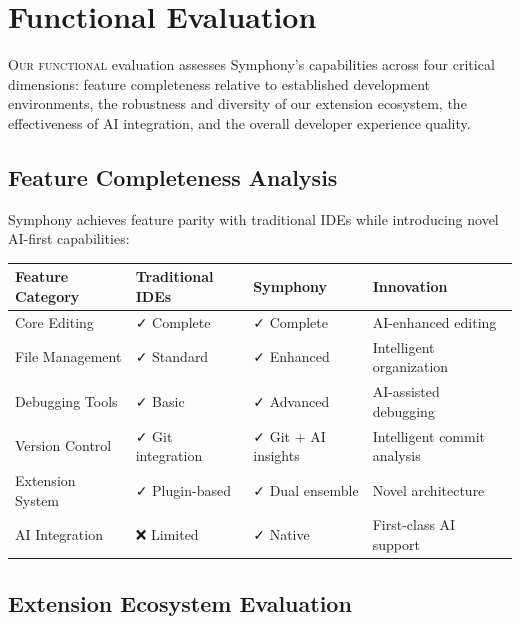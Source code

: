 
\section*{Functional Evaluation}

\lettrine{O}{ur functional} evaluation assesses Symphony's capabilities across four critical dimensions: feature completeness relative to established development environments, the robustness and diversity of our extension ecosystem, the effectiveness of AI integration, and the overall developer experience quality.

\subsection*{Feature Completeness Analysis}

Symphony achieves feature parity with traditional IDEs while introducing novel AI-first capabilities:

\begin{center}
\begin{tabular}{@{}llll@{}}
\toprule
\textbf{Feature Category} & \textbf{Traditional IDEs} & \textbf{Symphony} & \textbf{Innovation} \\
\midrule
Core Editing & ✓ Complete & ✓ Complete & AI-enhanced editing \\
File Management & ✓ Standard & ✓ Enhanced & Intelligent organization \\
Debugging Tools & ✓ Basic & ✓ Advanced & AI-assisted debugging \\
Version Control & ✓ Git integration & ✓ Git + AI insights & Intelligent commit analysis \\
Extension System & ✓ Plugin-based & ✓ Dual ensemble & Novel architecture \\
AI Integration & ❌ Limited & ✓ Native & First-class AI support \\
\bottomrule
\end{tabular}
\end{center}

\subsection*{Extension Ecosystem Evaluation}

